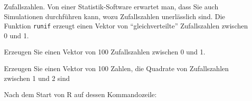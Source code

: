 Zufallszahlen. Von einer Statistik-Software erwartet man, dass Sie auch
Simulationen durchführen kann, wozu Zufallszahlen unerlässlich sind.
Die Funktion {\tt runif} erzeugt einen Vektor von ``gleichverteilte''
Zufallszahlen zwischen 0 und 1.
\begin{teilaufgaben}
\item Erzeugen Sie einen Vektor von 100 Zufallszahlen zwischen 0 und 1.
\item Erzeugen Sie einen Vektor von 100 Zahlen, die Quadrate
von Zufallszahlen zwischen 1 und 2 sind
\end{teilaufgaben}


\begin{loesung}
Nach dem Start von R auf dessen Kommandozeile:
\begin{small}
\end{small}
\end{loesung}

